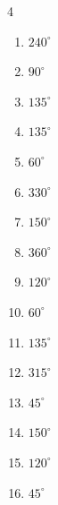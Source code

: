 \begin{multicols}{4}
\begin{enumerate}
  \item $\displaystyle 240^{\circ}$

  \item $\displaystyle 90^{\circ}$

  \item $\displaystyle 135^{\circ}$

  \item $\displaystyle 135^{\circ}$

  \item $\displaystyle 60^{\circ}$

  \item $\displaystyle 330^{\circ}$

  \item $\displaystyle 150^{\circ}$

  \item $\displaystyle 360^{\circ}$
        \phantom{$\displaystyle =2\pi$}

  \item $\displaystyle 120^{\circ}$

  \item $\displaystyle 60^{\circ}$

  \item $\displaystyle 135^{\circ}$

  \item $\displaystyle 315^{\circ}$

  \item $\displaystyle 45^{\circ}$

  \item $\displaystyle 150^{\circ}$

  \item $\displaystyle 120^{\circ}$

  \item $\displaystyle 45^{\circ}$


\end{enumerate}
\end{multicols}
